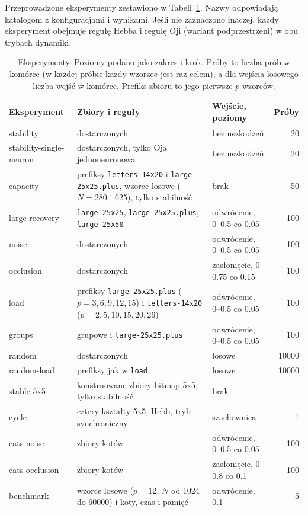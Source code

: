 Przeprowadzone eksperymenty zestawiono w Tabeli~\ref{tab:eksperymenty}. Nazwy odpowiadają katalogom z konfiguracjami i wynikami. Jeśli nie zaznaczono inaczej, każdy eksperyment obejmuje regułę Hebba i regułę Oji (wariant podprzestrzeni) w obu trybach dynamiki.

\begin{table}[H]
    \centering
    \caption{Eksperymenty. Poziomy podano jako zakres i krok. Próby to liczba prób w komórce (w każdej próbie każdy wzorzec jest raz celem), a dla wejścia losowego liczba wejść w komórce. Prefiks zbioru to jego pierwsze $p$ wzorców.}
    \label{tab:eksperymenty}
    \small
    \begin{tabularx}{\textwidth}{>{\ttfamily}l >{\raggedright\arraybackslash}X >{\raggedright\arraybackslash}p{4.1cm} r}
        \toprule
        \normalfont Eksperyment & Zbiory i reguły & Wejście, poziomy & Próby \\
        \midrule
        stability & 8 dostarczonych & bez uszkodzeń & 20 \\
        stability-single-neuron & 8 dostarczonych, tylko Oja jednoneuronowa & bez uszkodzeń & 20 \\
        capacity & prefiksy \texttt{letters-14x20} i \texttt{large-25x25.plus}, wzorce losowe ($N = 280$ i 625), tylko stabilność & brak & 50 \\
        large-recovery & \texttt{large-25x25}, \texttt{large-25x25.plus}, \texttt{large-25x50} & odwrócenie, \numrange{0}{0.5} co \num{0.05} & 100 \\
        noise & 8 dostarczonych & odwrócenie, \numrange{0}{0.5} co \num{0.05} & 100 \\
        occlusion & 8 dostarczonych & zasłonięcie, \numrange{0}{0.75} co \num{0.15} & 100 \\
        load & prefiksy \texttt{large-25x25.plus} ($p = 3, 6, 9, 12, 15$) i \texttt{letters-14x20} ($p = 2, 5, 10, 15, 20, 26$) & odwrócenie, \numrange{0}{0.5} co \num{0.05} & 100 \\
        groups & 4 grupowe i \texttt{large-25x25.plus} & odwrócenie, \numrange{0}{0.5} co \num{0.05} & 100 \\
        random & 8 dostarczonych & losowe & \num{10000} \\
        random-load & prefiksy jak w \texttt{load} & losowe & \num{10000} \\
        stable-5x5 & konstruowane zbiory bitmap \mbox{5x5}, tylko stabilność & brak & -- \\
        cycle & cztery kształty \mbox{5x5}, Hebb, tryb synchroniczny & szachownica & 1 \\
        cats-noise & 2 zbiory kotów & odwrócenie, \numrange{0}{0.5} co \num{0.05} & 100 \\
        cats-occlusion & 2 zbiory kotów & zasłonięcie, \numrange{0}{0.8} co \num{0.1} & 100 \\
        benchmark & wzorce losowe ($p = 12$, $N$ od \num{1024} do \num{60000}) i koty, czas i pamięć & odwrócenie, \num{0.1} & 5 \\
        \bottomrule
    \end{tabularx}
\end{table}
